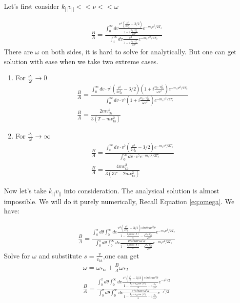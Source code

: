 


Let's first consider $k_{||}v_{||}<< \nu<< \omega$

\begin{eqnarray}
     \frac{B}{A}=\frac{ \int ^{\infty} _{0}   dv \frac{v^4(\frac{v^2}{2v^2_{th}}-3/2) }{1-i\frac{\nu_0\cdot v_{th}^3}{\omega v^3}} e^{-m_sv^2/2T_s}
     }{\int ^{\infty} _{0}   dv \frac{v^4}{1-i\frac{\nu_0\cdot v_{th}^3}{\omega v^3}} e^{-m_sv^2/2T_s}
     }
\end{eqnarray}
There are $\omega$ on both sides, it is hard to solve for analytically. But one can get solution with ease when we take two extreme cases. 
\begin{enumerate}
    \item For $\frac{\nu_0}{\omega}\longrightarrow 0$
    \begin{eqnarray}
         \frac{B}{A}=\frac{ \int ^{\infty} _{0}   dv \cdot v^5(\frac{v^2}{2v^2_{th}}-3/2) (1+i\frac{\nu_0\cdot v_{th}^3}{\omega v^3}) e^{-m_sv^2/2T_s}
     }{\int ^{\infty} _{0}   dv\cdot v^5 (1+i\frac{\nu_0\cdot v_{th}^3}{\omega v^3}) e^{-m_sv^2/2T_s}
     }\\
     \frac{B}{A}=\frac{2 m v_{th}^2}{3 (T - m v_{th}^2)}
    \end{eqnarray}
    \item For $\frac{\nu_0}{\omega}\longrightarrow \infty$
    \begin{eqnarray}
         \frac{B}{A}=\frac{ \int ^{\infty} _{0}   dv \cdot v^7(\frac{v^2}{2v^2_{th}}-3/2) e^{-m_sv^2/2T_s}
     }{\int ^{\infty} _{0}   dv\cdot v^7 e^{-m_sv^2/2T_s}
     }\\
     \frac{B}{A}=\frac{4 m v_{th}^2}{3 (3 T - 2 m v_{th}^2)}
    \end{eqnarray}
\end{enumerate}

Now let's take $k_{||}v_{||}$ into consideration. The analysical solution is almost impossible. We will do it purely numerically, Recall Equation \ref{eq:omega}. We have: 

\begin{eqnarray}
     \frac{B}{A}=\frac{\int^{\pi}_{0}d\theta \int ^{\infty} _{0}   dv \frac{v^4(\frac{v^2}{2v^2_{th}}-3/2) sin\theta cos^2\theta}{1-\frac{k_{||}v cos(\theta)}{\omega}-i\frac{\nu_0\cdot v_{th}^3}{\omega v^3}} e^{-m_sv^2/2T_s}
     }{\int^{\pi}_{0}d\theta \int ^{\infty} _{0}   dv \frac{v^4 sin\theta cos^2\theta}{1-\frac{k_{||}v cos(\theta)}{\omega}-i\frac{\nu_0\cdot v_{th}^3}{\omega v^3}} e^{-m_sv^2/2T_s}
     }
\end{eqnarray}
Solve for $\omega$ and substitute $s=\frac{v}{v_{th}}$,one can get
\begin{eqnarray}
     \omega=\omega_{*n}+\frac{B}{A}\omega_{*T}\\
     \frac{B}{A}=\frac{\int^{\pi}_{0}d\theta \int ^{\infty} _{0}   dv \frac{s^4(\frac{s^2}{2}-3/2) sin\theta cos^2\theta}{1-\frac{k_{||}s\cdot v_{th} cos(\theta)}{\omega}-i\frac{\nu_0 }{\omega s^3}} e^{-s^2/2}
     }{\int^{\pi}_{0}d\theta \int ^{\infty} _{0}   dv \frac{s^4 sin\theta cos^2\theta}{1-\frac{k_{||}s\cdot v_{th} cos(\theta)}{\omega}-i\frac{\nu_0 }{\omega s^3}} e^{-s^2/2}
     }
     \label{eq:B/A}
\end{eqnarray}

